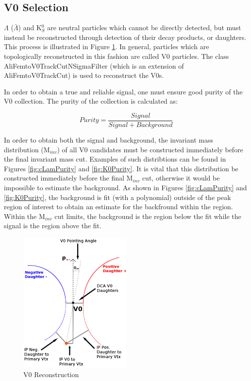\documentclass[../AnalysisNoteJBuxton.tex]{subfiles}
\begin{document}
\subsection{V0 Selection}
\label{V0Selection}

$\Lambda$ ($\bar{\Lambda}$) and K$^{0}_{S}$ are neutral particles which cannot be directly detected, but must instead be reconstructed through detection of their decay products, or daughters.  
This process is illustrated in Figure \ref{fig:V0Reconstruction}.
In general, particles which are topologically reconstructed in this fashion are called V0 particles.
The class AliFemtoV0TrackCutNSigmaFilter (which is an extension of AliFemtoV0TrackCut) is used to reconstruct the V0s.

In order to obtain a true and reliable signal, one must ensure good purity of the V0 collection.  The purity of the collection is calculated as:

\begin{equation}
 Purity = \frac{Signal}{Signal + Background}
\label{eqn:Purity}
\end{equation}

In order to obtain both the signal and background, the invariant mass distribution (M$_{inv}$) of all V0 candidates must be constructed immediately before the final invariant mass cut.
Examples of such distribtions can be found in Figures \ref{fig:cLamPurity} and \ref{fig:K0Purity}.
It is vital that this distribution be constructed immediately before the final M$_{inv}$ cut, otherwise it would be impossible to estimate the background.
As shown in Figures \ref{fig:cLamPurity} and \ref{fig:K0Purity}, the background is fit (with a polynomial) outside of the peak region of interest to obtain an estimate for the backfround within the region.
Within the M$_{inv}$ cut limits, the background is the region below the fit while the signal is the region above the fit.

\begin{figure}[h]
  \centering
  \includegraphics[width=0.5\textwidth]{3_DataSelection/Figures/V0CutsGeneral.pdf}
  \caption[V0 Reconstruction]{V0 Reconstruction}
  \label{fig:V0Reconstruction}
\end{figure}



\end{document}
